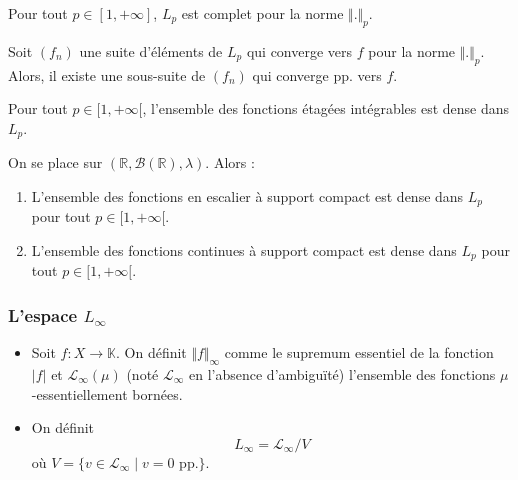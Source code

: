   \begin{theorem}
    Pour tout $p \in [1, +\infty]$, $L_p$ est complet pour la norme $\Vert . \Vert_p$.
  \end{theorem}

  \begin{theorem}
    Soit $(f_n)$ une suite d'éléments de $L_p$ qui converge vers $f$ pour la norme $\Vert . \Vert_p$. Alors, il existe une sous-suite de $(f_n)$ qui converge pp. vers $f$.
  \end{theorem}


  \begin{proposition}
    Pour tout $p \in [1, +\infty[$, l'ensemble des fonctions étagées intégrables est dense dans $L_p$.
  \end{proposition}

  \begin{theorem}
    On se place sur $(\mathbb{R}, \mathcal{B}(\mathbb{R}), \lambda)$. Alors :
    \begin{enumerate}[label={\bfseries(\roman*)}]
      \item L'ensemble des fonctions en escalier à support compact est dense dans $L_p$ pour tout $p \in [1, +\infty[$.
      \item L'ensemble des fonctions continues à support compact est dense dans $L_p$ pour tout $p \in [1, +\infty[$.
    \end{enumerate}
  \end{theorem}

  \subsubsection{L'espace \texorpdfstring{$L_\infty$}{L∞}}


  \begin{definition}
    \begin{itemize}
      \item Soit $f : X \rightarrow \mathbb{K}$. On définit $\Vert f \Vert_\infty$  comme le supremum essentiel de la fonction $\vert f \vert$ et $\mathcal{L}_\infty(\mu)$ (noté $\mathcal{L}_\infty$ en l'absence d'ambiguïté) l'ensemble des fonctions $\mu$-essentiellement bornées.
      \item On définit
      \[ L_\infty = \mathcal{L}_\infty / V \]
      où $V = \{ v \in \mathcal{L}_\infty \mid v = 0 \text{ pp.} \}$.
    \end{itemize}
  \end{definition}

